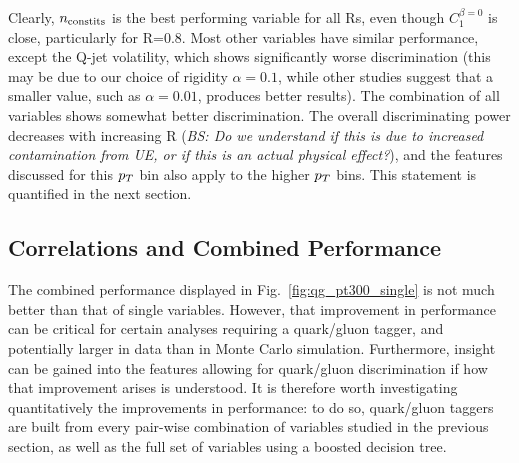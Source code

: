 Clearly, $n_{\rm constits}$ is the best performing variable for all Rs, even though $C_1^{\beta=0}$ is close, particularly
for R=0.8. Most other variables have similar performance, except the Q-jet volatility, which shows significantly worse
discrimination (this may be due to our choice of
rigidity $\alpha = 0.1$, while other studies suggest that a smaller value,
such as $\alpha = 0.01$, produces better results). The combination of all variables shows somewhat better discrimination. The overall discriminating 
power decreases with increasing R (\emph{BS: Do we understand if this is due to increased contamination from UE,
or if this is an actual physical effect?}), and the features discussed for this $p_T$ bin also apply to the higher
$p_T$ bins. This statement is quantified in the next section. 


\subsection{Correlations and Combined Performance}\label{sec:qg_combi}
The combined performance displayed in Fig.~\ref{fig:qg_pt300_single} is not much
better than that of single variables. However, that improvement in performance can
be critical for certain analyses requiring a quark/gluon tagger, and potentially larger in
data than in Monte Carlo simulation. Furthermore, insight can be gained into the 
features allowing for quark/gluon discrimination if how that improvement arises is
understood. It is therefore worth investigating quantitatively
the improvements in performance: to do so, quark/gluon taggers are built from
every pair-wise combination of variables studied in the previous section, as well as
the full set of variables using a boosted decision tree. 

